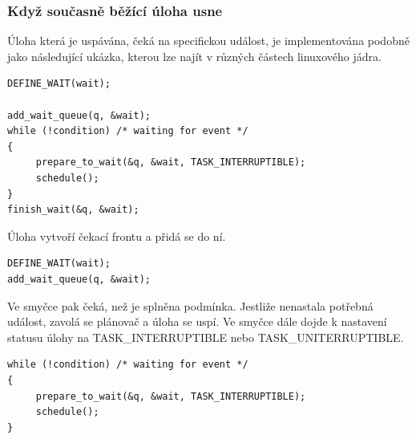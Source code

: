 \documentclass[a4paper,12pt]{article}
\begin{document}

%
%
%
%
%
%

%
\subsubsection{Když současně běžící úloha usne}

Úloha která je uspávána, čeká na specifickou událost, je implementována podobně jako následující ukázka, kterou lze najít v různých částech linuxového jádra.

\begin{verbatim} 
DEFINE_WAIT(wait); 

add_wait_queue(q, &wait); 
while (!condition) /* waiting for event */
{ 
     prepare_to_wait(&q, &wait, TASK_INTERRUPTIBLE); 
     schedule(); 
} 
finish_wait(&q, &wait);
\end{verbatim}
\pagebreak 
Úloha vytvoří čekací frontu a přidá se do ní. 
\nopagebreak
\begin{verbatim}
DEFINE_WAIT(wait);
add_wait_queue(q, &wait);
\end{verbatim}
Ve smyčce pak čeká, než je splněna podmínka. Jestliže nenastala potřebná událost, zavolá se plánovač a úloha se uspí. Ve smyčce dále dojde k nastavení statusu úlohy na TASK\_INTERRUPTIBLE nebo TASK\_UNITERRUPTIBLE.  
\begin{verbatim}
while (!condition) /* waiting for event */
{ 
     prepare_to_wait(&q, &wait, TASK_INTERRUPTIBLE); 
     schedule(); 
} 
\end{verbatim}
\end{document}
